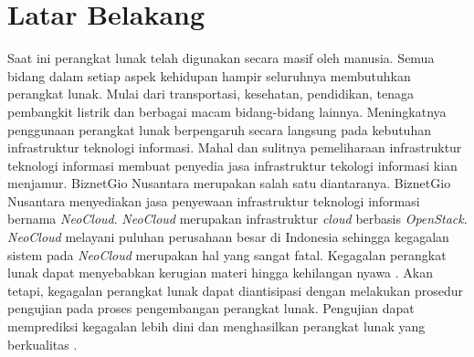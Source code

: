 


\section{Latar Belakang}

Saat ini perangkat lunak telah digunakan secara masif oleh
manusia. Semua bidang dalam setiap aspek kehidupan hampir seluruhnya
membutuhkan perangkat lunak. Mulai dari transportasi, kesehatan,
pendidikan, tenaga pembangkit listrik dan berbagai macam bidang-bidang
lainnya. Meningkatnya penggunaan perangkat lunak berpengaruh secara
langsung pada kebutuhan infrastruktur teknologi informasi. Mahal dan
sulitnya pemeliharaan infrastruktur teknologi informasi membuat
penyedia jasa infrastruktur tekologi informasi kian menjamur.
BiznetGio Nusantara merupakan salah satu diantaranya. BiznetGio
Nusantara menyediakan jasa penyewaan infrastruktur teknologi informasi
bernama \emph{NeoCloud}. \emph{NeoCloud} merupakan infrastruktur
\emph{cloud} berbasis \emph{OpenStack}. \emph{NeoCloud} melayani
puluhan perusahaan besar di Indonesia sehingga kegagalan sistem pada
\emph{NeoCloud} merupakan hal yang sangat fatal. Kegagalan perangkat
lunak dapat menyebabkan kerugian materi hingga kehilangan nyawa
\parencite{wong2009role}. Akan tetapi, kegagalan perangkat lunak dapat
diantisipasi dengan melakukan prosedur pengujian pada proses
pengembangan perangkat lunak. Pengujian dapat memprediksi kegagalan
lebih dini dan menghasilkan perangkat lunak yang berkualitas
\parencite{burnstein2006practical}.

